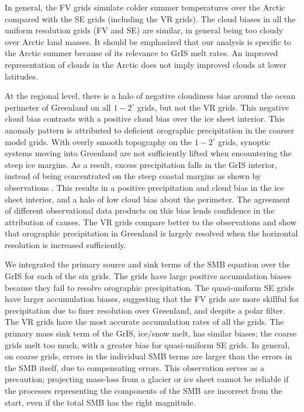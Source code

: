 \documentclass[draft]{agujournal2019}
\begin{document}
In general, the FV grids simulate colder summer temperatures over the Arctic compared with the SE grids (including the VR grids). The cloud biases in all the {\color{blue}{lat-lon and quasi-}}uniform resolution grids {\color{blue}(FV and SE)} are similar, in general being too cloudy over Arctic land masses. It should be emphasized that our analysis is specific to the Arctic summer because of its relevance to GrIS melt rates. An improved representation of clouds in the Arctic does not imply improved clouds at lower latitudes.

At the regional level, there is a halo of negative cloudiness bias around the ocean perimeter of Greenland on all $1-2^{\circ}$ grids, but not the VR grids. This negative cloud bias contrasts with a positive cloud bias over the ice sheet interior. This anomaly pattern is attributed to deficient orographic precipitation in the coarser model grids.  With overly smooth topography on the $1-2^{\circ}$ grids, synoptic systems moving into Greenland are not sufficiently lifted when encountering the steep ice margins. As a result, excess precipitation falls in the GrIS interior, instead of being concentrated on the steep coastal margins as shown by observations \cite{P2000GPC,VETAL2018TC}. This results in a positive precipitation and cloud bias in the ice sheet interior, and a halo of low cloud bias about the perimeter. The agreement of different observational data products on this bias lends confidence in the attribution of causes. The VR grids compare better to the observations and show that orographic precipitation in Greenland is largely resolved when the horizontal resolution is increased sufficiently.

We integrated the primary source and sink terms of the SMB equation over the GrIS for each of the six grids. The {} grids have large positive accumulation biases because they fail to resolve orographic precipitation. The quasi-uniform SE grids have larger accumulation biases, suggesting that the FV grids are more skillful for precipitation due to finer resolution over Greenland, and despite a polar filter. The VR grids have the most accurate accumulation rates of all the grids. The primary mass sink term of the GrIS, ice/snow melt, has similar biases; the coarse grids melt too much, with a greater bias for quasi-uniform SE grids. In general, on coarse grids, errors in the individual SMB terms are larger than the errors in the SMB itself, due to compensating errors. This observation serves as a precaution; projecting mass-loss from a glacier or ice sheet cannot be reliable if the processes representing the components of the SMB are incorrect from the start, even if the total SMB has the right magnitude.
\end{document}
